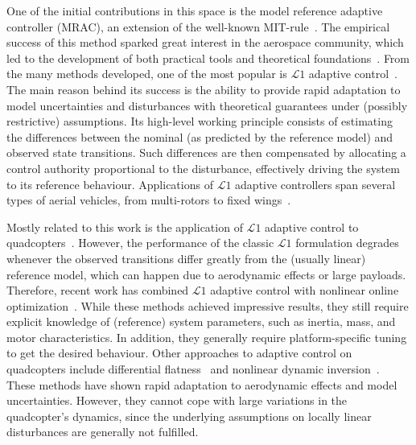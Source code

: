 One of the initial contributions in this space is the model reference adaptive controller (MRAC), an extension of the well-known MIT-rule~\cite{MAREELSMit}.
%
The empirical success of this method sparked great interest in the aerospace community, which led to the development of both practical tools and theoretical foundations~\cite{aastrom2013adaptive, lavretsky2013robust}.
%
From the many methods developed, one of the most popular is $\mathcal{L}1$ adaptive control~\cite{cao2008design,hovakimyan2010l1}.
%
The main reason behind its success is the ability to provide rapid adaptation to model uncertainties and disturbances with theoretical guarantees under (possibly restrictive) assumptions.
%
Its high-level working principle consists of estimating the differences between the nominal (as predicted by the reference model) and observed state transitions.
%
Such differences are then compensated by allocating a control authority proportional to the disturbance, effectively driving the system to its reference behaviour.
%
Applications of $\mathcal{L}1$ adaptive controllers span several types of aerial vehicles, from multi-rotors to fixed wings~\cite{mallikarjunan2012l1, gregory2009l1}.

Mostly related to this work is the application of $\mathcal{L}1$ adaptive control to quadcopters~\cite{schreier2012modeling}.
%
However, the performance of the classic $\mathcal{L}1$ formulation degrades whenever the observed transitions differ greatly from the (usually linear) reference model, which can happen due to aerodynamic effects or large payloads.
%
Therefore, recent work has combined $\mathcal{L}1$ adaptive control with nonlinear online optimization~\cite{hanover2021performance, pravitra2020, pereida2018adaptive}.
%
While these methods achieved impressive results, they still require explicit knowledge of (reference) system parameters, such as inertia, mass, and motor characteristics.
%
In addition, they generally require platform-specific tuning to get the desired behaviour. 
%
Other approaches to adaptive control on quadcopters include differential flatness~\cite{faessler2017differential} and nonlinear dynamic inversion~\cite{smeur2016adaptive}.
%
These methods have shown rapid adaptation to aerodynamic effects and model uncertainties.
%
However, they cannot cope with large variations in the quadcopter's dynamics, since the underlying assumptions on locally linear disturbances are generally not fulfilled.
 


